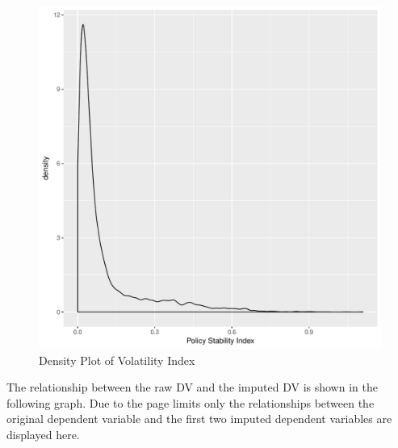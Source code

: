 \documentclass[12pt]{article}\usepackage[]{graphicx}\usepackage[]{color}
\makeatletter
\def\maxwidth{ %
  \ifdim\Gin@nat@width>\linewidth
    \linewidth
  \else
    \Gin@nat@width
  \fi
}
\newenvironment{knitrout}{}{} %
\makeatother
\begin{document}
\begin{figure}
\begin{knitrout}
\color{fgcolor}
\includegraphics[width=\maxwidth]{figure/density-1} 

\end{knitrout}
\label{density}
\caption{Density Plot of Volatility Index}
\end{figure}


The relationship between the raw DV and the imputed DV is shown in the following graph. Due to the page limits only the relationships between the original dependent variable and the first two imputed dependent variables are displayed here. 







\newpage
\singlespacing 


\end{document}
